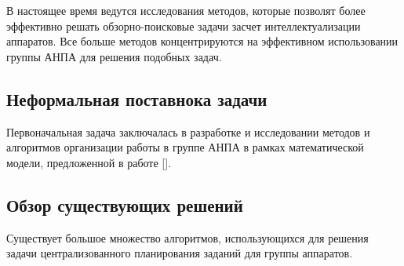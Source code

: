 \documentclass[a4paper,14pt,russian]{article}
\begin{document}
В настоящее время ведутся исследования методов, которые позволят более эффективно решать обзорно-поисковые задачи засчет интеллектуализации аппаратов. Все больше методов концентрируются на эффективном использовании группы АНПА для решения подобных задач.


\subsection{Неформальная поставнока задачи}

Первоначальная задача заключалась в разработке и исследовании методов и алгоритмов организации работы в группе АНПА в рамках математической модели, предложенной в работе [].




\subsection{Обзор существующих решений}

Существует большое множество алгоритмов, использующихся для решения задачи централизованного планирования заданий для группы аппаратов.
\end{document}

